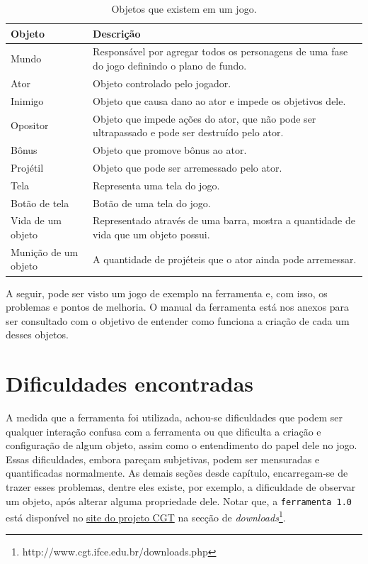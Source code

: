 \documentclass[12pt,twoside,openright,a4paper,english,brazil,sumario=tradicional]{abntex2}
\begin{document}
\begin{table}[htb]
\centering
\begin{tabular}{| l | p{7cm} |}
      \hline
      \textbf{Objeto} & \textbf{Descrição} \\
      \hline
      Mundo & Responsável por agregar todos os personagens de uma fase do jogo definindo o plano de fundo.  \\
      \hline
      Ator & Objeto controlado pelo jogador. \\
      \hline
      Inimigo & Objeto que causa dano ao ator e impede os objetivos dele. \\
      \hline
      Opositor & Objeto que impede ações do ator, que não pode ser ultrapassado e pode ser destruído pelo ator.  \\
      \hline
      Bônus & Objeto que promove bônus ao ator. \\
      \hline
      Projétil & Objeto que pode ser arremessado pelo ator. \\
      \hline
      Tela & Representa uma tela do jogo. \\
      \hline
      Botão de tela & Botão de uma tela do jogo. \\
      \hline
      Vida de um objeto & Representado através de uma barra, mostra a quantidade de vida que um objeto possui. \\
      \hline
      Munição de um objeto & A quantidade de projéteis que o ator ainda pode arremessar. \\
      \hline
   \end{tabular}
\caption{Objetos que existem em um jogo.}
\label{table:objetos-desc}
\end{table}

A seguir, pode ser visto um jogo de exemplo na ferramenta e, com isso, os problemas e pontos de melhoria. O manual da ferramenta está nos anexos para ser consultado com o objetivo de entender como funciona a criação de cada um desses objetos.

\section{Dificuldades encontradas}
\label{sec:dificuldades}
A medida que a ferramenta foi utilizada, achou-se dificuldades que podem ser qualquer interação confusa com a ferramenta ou que dificulta a criação e configuração de algum objeto, assim como o entendimento do papel dele no jogo. Essas dificuldades, embora pareçam subjetivas, podem ser mensuradas e quantificadas normalmente. As demais seções desde capítulo, encarregam-se de trazer esses problemas, dentre eles existe, por exemplo, a dificuldade de observar um objeto, após alterar alguma propriedade dele.
Notar que, a \texttt{ferramenta 1.0} está disponível no \href{http://www.cgt.ifce.edu.br/downloads.php}{site do projeto CGT} na secção de \emph{downloads}\footnote{http://www.cgt.ifce.edu.br/downloads.php}.
\end{document}
